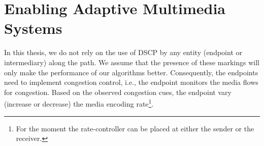 \section{Enabling Adaptive Multimedia Systems}
\label{rg.title}

In this thesis, we do not rely on the use of DSCP by any entity (endpoint or
intermediary) along the path. We assume that the presence of these markings
will only make the performance of our algorithms better. Consequently, the
endpoints need to implement congestion control, i.e., the endpoint monitors
the media flows for congestion. Based on the observed congestion cues, the
endpoint vary (increase or decrease) the media encoding rate\footnote{For the
moment the rate-controller can be placed at either the sender or the
receiver.}. 





